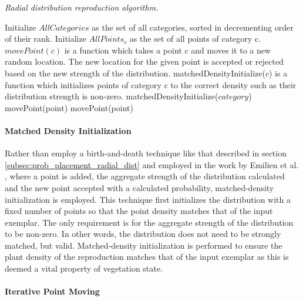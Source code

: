 \begin{algorithm}
\caption{\textit{Radial distribution reproduction algorithm.}}
\begin{algorithmic}[1]
\REQUIRE Initialize $AllCategories$ as the set of all categories, sorted in decrementing order of their rank.
\REQUIRE Initialize $AllPoints_{c}$ as the set of all points of category c.
\REQUIRE $movePoint(c)$ is a function which takes a point c and moves it to a new random location. The new location for the given point is accepted or rejected based on the new strength of the distribution.
\REQUIRE matchedDensityInitialize($c$) is a function which initializes points of category c to the correct density such as their distribution strength is non-zero. 
	\STATE matchedDensityInitialize($category$)
		\STATE movePoint(point)
		\STATE movePoint(point)
	\ENDFOR
\ENDFOR
\end{algorithmic}
\label{alg:radial_dist_reproduction_algo}
\end{algorithm}

\paragraph{Matched Density Initialization}

Rather than employ a birth-and-death technique like that described in section \ref{subsec:prob_placement_radial_dist} and employed in the work by Emilien et al. \cite{Emilien}, where a point is added, the aggregate strength of the distribution calculated and the new point accepted with a calculated probability, matched-density initialization is employed. This technique first initializes the distribution with a fixed number of points so that the point density matches that of the input exemplar. The only requirement is for the aggregate strength of the distribution to be non-zero. In other words, the distribution does not need to be strongly matched, but valid. Matched-density initialization is performed to ensure the plant density of the reproduction matches that of the input exemplar as this is deemed a vital property of vegetation state.\\

\paragraph{Iterative Point Moving} 

